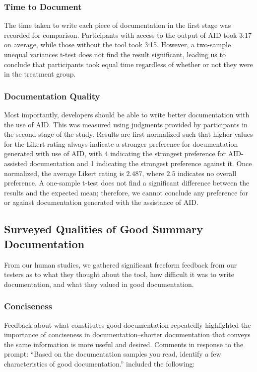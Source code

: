 \documentclass[preprint]{sigplanconf}
\begin{document}
\subsubsection{Time to Document}
The time taken to write each piece of documentation in the first stage was recorded for comparison. Participants with access to the output of AID took 3:17 on average, while those without the tool took 3:15. However, a two-sample unequal variances t-test does not find the result significant, leading us to conclude that participants took equal time regardless of whether or not they were in the treatment group.

\subsubsection{Documentation Quality}
Most importantly, developers should be able to write better documentation with the use of AID. This was measured using judgments provided by participants in the second stage of the study. Results are first normalized such that higher values for the Likert rating always indicate a stronger preference for documentation generated with use of AID, with 4 indicating the strongest preference for AID-assisted documentation and 1 indicating the strongest preference against it. Once normalized, the average Likert rating is \(2.487\), where \(2.5\) indicates no overall preference. A one-sample t-test does not find a significant difference between the results and the expected mean; therefore, we cannot conclude any preference for or against documentation generated with the assistance of AID.

\subsection{Surveyed Qualities of Good Summary Documentation}
From our human studies, we gathered significant freeform feedback from our testers as to what they thought about the tool, how difficult it was to write documentation, and what they valued in good documentation.

\subsubsection{Conciseness}

Feedback about what constitutes good documentation repeatedly highlighted the importance of conciseness in documentation--shorter documentation that conveys the same information is more useful and desired. Comments in response to the prompt: ``Based on the documentation samples you read, identify a few characteristics of good documentation.'' included the following:
\end{document}
